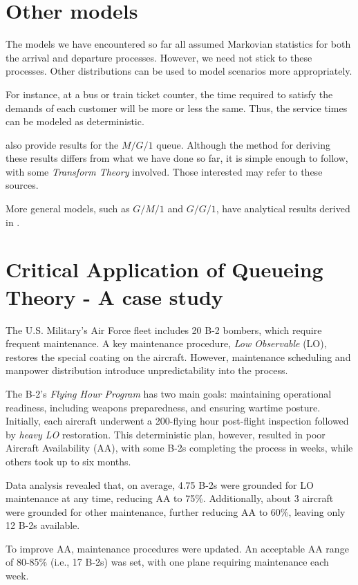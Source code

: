 \documentclass[11pt, a4paper]{report}
\begin{document}
\section{Other models}
The models we have encountered so far all assumed Markovian statistics for both the arrival and departure processes. However, we need not stick to these processes. Other distributions can be used to model scenarios more appropriately.

For instance, at a bus or train ticket counter, the time required to satisfy the demands of each customer will be more or less the same. Thus, the service times can be modeled as deterministic.

\cite{RobertazziQ,myReference} also provide results for the $M/G/1$ queue. Although the method for deriving these results differs from what we have done so far, it is simple enough to follow, with some \emph{Transform Theory} involved. Those interested may refer to these sources.

More general models, such as $G/M/1$ and $G/G/1$, have analytical results derived in \cite{10.1214/aoms/1177728975,kleinrock1974queueing}.

\section{Critical Application of Queueing Theory - A case study}
The U.S. Military’s Air Force fleet includes 20 B-2 bombers, which require frequent maintenance. A key maintenance procedure, \emph{Low Observable} (LO), restores the special coating on the aircraft. However, maintenance scheduling and manpower distribution introduce unpredictability into the process.

The B-2’s \emph{Flying Hour Program} has two main goals: maintaining operational readiness, including weapons preparedness, and ensuring wartime posture. Initially, each aircraft underwent a 200-flying hour post-flight inspection followed by \emph{heavy LO} restoration. This deterministic plan, however, resulted in poor Aircraft Availability (AA), with some B-2s completing the process in weeks, while others took up to six months.

Data analysis revealed that, on average, 4.75 B-2s were grounded for LO maintenance at any time, reducing AA to 75\%. Additionally, about 3 aircraft were grounded for other maintenance, further reducing AA to 60\%, leaving only 12 B-2s available.

To improve AA, maintenance procedures were updated. An acceptable AA range of 80-85\% (i.e., 17 B-2s) was set, with one plane requiring maintenance each week.
\end{document}
